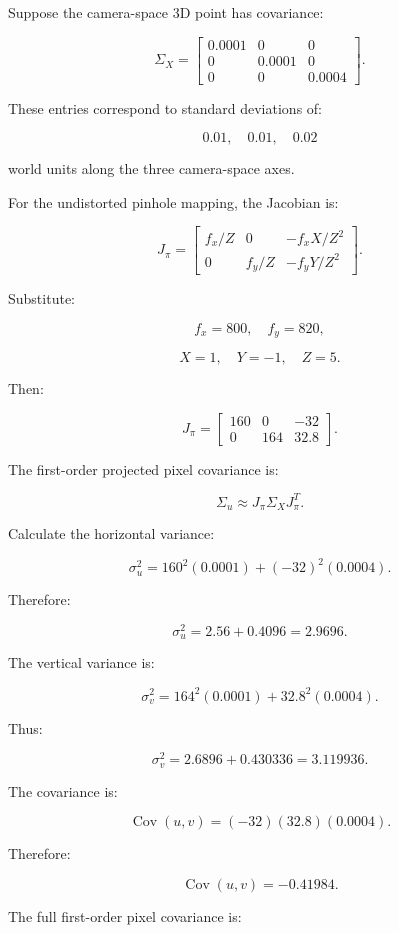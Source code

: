 Suppose the camera-space 3D point has covariance:

\[
 \Sigma_X= \begin{bmatrix} 0.0001&0&0\\ 0&0.0001&0\\ 0&0&0.0004 \end{bmatrix}.
\]

These entries correspond to standard deviations of:

\[
 0.01,\quad0.01,\quad0.02
\]

world units along the three camera-space axes.

For the undistorted pinhole mapping, the Jacobian is:

\[
 J_\pi= \begin{bmatrix} f_x/Z&0&-f_xX/Z^2\\ 0&f_y/Z&-f_yY/Z^2 \end{bmatrix}.
\]

Substitute:

\[
 f_x=800,\quad f_y=820,
\]

\[
 X=1,\quad Y=-1,\quad Z=5.
\]

Then:

\[
 \boxed{ J_\pi= \begin{bmatrix} 160&0&-32\\ 0&164&32.8 \end{bmatrix} }.
\]

The first-order projected pixel covariance is:

\[
 \Sigma_u\approx J_\pi\Sigma_XJ_\pi^T.
\]

Calculate the horizontal variance:

\[
 \sigma_u^2= 160^2(0.0001)+(-32)^2(0.0004).
\]

Therefore:

\[
 \sigma_u^2=2.56+0.4096 =\boxed{2.9696}.
\]

The vertical variance is:

\[
 \sigma_v^2= 164^2(0.0001)+32.8^2(0.0004).
\]

Thus:

\[
 \sigma_v^2= 2.6896+0.430336 =\boxed{3.119936}.
\]

The covariance is:

\[
 \operatorname{Cov}(u,v) = (-32)(32.8)(0.0004).
\]

Therefore:

\[
 \boxed{ \operatorname{Cov}(u,v)=-0.41984 }.
\]

The full first-order pixel covariance is:

